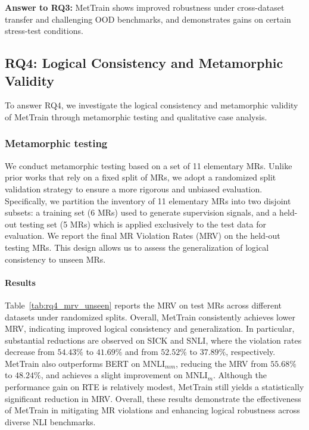 \documentclass[lettersize,journal]{IEEEtran}
\begin{document}
\begin{tcolorbox}[sharp corners,left=1pt,right=1pt,top=1pt,bottom=1pt,boxsep=1pt,colframe=black]
	\textbf{Answer to RQ3:} MetTrain shows improved robustness under cross-dataset transfer and challenging OOD benchmarks, and demonstrates gains on certain stress-test conditions.
\end{tcolorbox}


\subsection{RQ4: Logical Consistency and Metamorphic Validity}
To answer RQ4, we investigate the logical consistency and metamorphic validity of MetTrain through metamorphic testing and qualitative case analysis.
\subsubsection{Metamorphic testing}
We conduct metamorphic testing based on a set of 11 elementary MRs. Unlike prior works that rely on a fixed split of MRs, we adopt a randomized split validation strategy to ensure a more rigorous and unbiased evaluation. Specifically, we partition the inventory of 11 elementary MRs into two disjoint subsets: a training set (6 MRs) used to generate supervision signals, and a held-out testing set (5 MRs) which is applied exclusively to the test data for evaluation. We report the final MR Violation Rates (MRV) on the held-out testing MRs. This design allows us to assess the generalization of logical consistency to unseen MRs.

\paragraph{Results} 
Table~\ref{tab:rq4_mrv_unseen} reports the MRV on test MRs across different datasets under randomized splits. Overall, MetTrain consistently achieves lower MRV, indicating improved logical consistency and generalization. In particular, substantial reductions are observed on SICK and SNLI, where the violation rates decrease from $54.43\%$ to $41.69\%$ and from $52.52\%$ to $37.89\%$, respectively. MetTrain also outperforms BERT on MNLI$_{mm}$, reducing the MRV from $55.68\%$ to $48.24\%$, and achieves a slight improvement on MNLI$_m$. Although the performance gain on RTE is relatively modest, MetTrain still yields a statistically significant reduction in MRV. Overall, these results demonstrate the effectiveness of MetTrain in mitigating MR violations and enhancing logical robustness across diverse NLI benchmarks.
\end{document}
